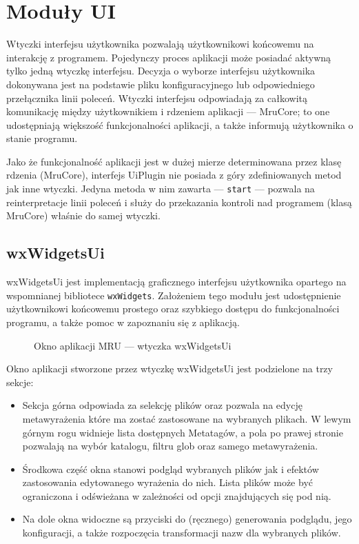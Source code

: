\section{Moduły UI}
\par
Wtyczki interfejsu użytkownika pozwalają użytkownikowi końcowemu na interakcję z programem.
Pojedynczy proces aplikacji może posiadać aktywną tylko jedną wtyczkę interfejsu. Decyzja o wyborze interfejsu użytkownika dokonywana jest na podstawie pliku konfiguracyjnego lub odpowiedniego przełącznika linii poleceń.
Wtyczki interfejsu odpowiadają za całkowitą komunikację między użytkownikiem i rdzeniem aplikacji --- MruCore; to one udostępniają większość funkcjonalności aplikacji, a także informują użytkownika o stanie programu.
\par
Jako że funkcjonalność aplikacji jest w dużej mierze determinowana przez klasę rdzenia (MruCore), interfejs UiPlugin nie posiada z góry zdefiniowanych metod jak inne wtyczki. Jedyna metoda w nim zawarta --- \texttt{start} --- pozwala na reinterpretacje linii poleceń i służy do przekazania kontroli nad programem (klasą MruCore) właśnie do samej wtyczki.

\subsection{wxWidgetsUi}
\par
wxWidgetsUi jest implementacją graficznego interfejsu użytkownika opartego na wspomnianej bibliotece \texttt{wxWidgets}. Założeniem tego modułu jest udostępnienie użytkownikowi końcowemu prostego oraz szybkiego dostępu do funkcjonalności programu, a także pomoc w zapoznaniu się z aplikacją.

\begin{figure}
\begin{center}
\end{center}
\caption{Okno aplikacji MRU --- wtyczka wxWidgetsUi}
\end{figure}

Okno aplikacji stworzone przez wtyczkę wxWidgetsUi jest podzielone na trzy sekcje:
\begin{itemize}
\item Sekcja górna odpowiada za selekcję plików oraz pozwala na edycję metawyrażenia które ma zostać zastosowane na wybranych plikach.
W lewym górnym rogu widnieje lista dostępnych Metatagów, a pola po prawej stronie pozwalają na wybór katalogu, filtru glob oraz samego metawyrażenia.

\item Środkowa część okna stanowi podgląd wybranych plików jak i efektów zastosowania edytowanego wyrażenia do nich. Lista plików może być ograniczona i odświeżana w zależności od opcji znajdujących się pod nią.

\item Na dole okna widoczne są przyciski do (ręcznego) generowania podglądu, jego konfiguracji, a także rozpoczęcia transformacji nazw dla wybranych plików.
\end{itemize}

